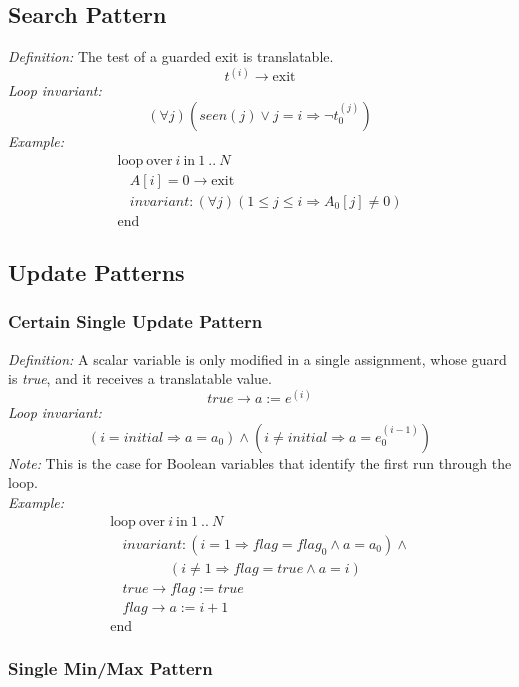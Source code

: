 \documentclass[a4paper,10pt]{article}
\newcommand{\idx}{\ensuremath{i}\xspace}
\newcommand{\idxinitial}{\ensuremath{\mathit{initial}}\xspace}
\newcommand{\at}[1]{{(#1)}}
\newcommand{\KWloop}{\ensuremath{\mathrm{loop}~}}
\newcommand{\KWend}{\ensuremath{\mathrm{end}~}}
\newcommand{\KWover}{\ensuremath{\mathrm{over}~}}
\newcommand{\KWin}{\ensuremath{~\mathrm{in}~}}
\newcommand{\KWexit}{\ensuremath{\mathrm{exit}}}
\newcommand{\impl}{\ensuremath{\Longrightarrow}}
\newcommand{\seen}[1]{\ensuremath{\mathit{seen}(#1)}\xspace}
\newcommand{\loopinvariant}{\noindent\textit{Loop invariant:}\xspace}
\newcommand{\patterndef}{\noindent\textit{Definition:}\xspace}
\newcommand{\patternexample}{\noindent\textit{Example:}\xspace}
\newcommand{\patternnote}{\noindent\textit{Note:}\xspace}
\newcommand{\translatable}{translatable}
\begin{document}
\subsection{Search Pattern}

\patterndef The test of a guarded exit is \translatable.
%
$$t^\at{\idx} \rightarrow \KWexit$$
%
\loopinvariant
%
$$(\forall j)(\seen{j} \lor j = i \impl \neg t_{0}^\at{j})$$
%
\patternexample
$$\begin{array}{l}
  \KWloop \KWover i \KWin 1~..~N \\
  ~~~~ A[i]=0 \rightarrow \KWexit \\
  ~~~~ \textit{invariant}:(\forall j)(1\leq j\leq i \impl A_{0}[j] \neq 0)\\
  \KWend
\end{array}$$

\subsection{Update Patterns}

\subsubsection*{Certain Single Update Pattern}

\patterndef A scalar variable is only modified in a single assignment, whose
guard is \textit{true}, and it receives a translatable value.
%
$$\mathit{true} \rightarrow a := e^\at{\idx}$$
%
\loopinvariant
%
$$(\idx = \idxinitial \impl a = a_0) \land (\idx \neq \idxinitial \impl a = e_0^\at{\idx - 1})$$
%
\patternnote This is the case for Boolean variables that identify the first run
through the loop.\\
%
\patternexample
$$\begin{array}{l}
  \KWloop \KWover i \KWin 1~..~N \\
  ~~~~ \textit{invariant}: (\idx = 1 \impl flag = flag_0 \land a = a_0) \land \\
  ~~~~~~~~~~~~~~~~~~~ (\idx \neq 1 \impl flag = true \land a = i)\\
  ~~~~ true \rightarrow flag := true\\
  ~~~~ flag \rightarrow a := i+1\\
  \KWend
\end{array}$$

\subsubsection*{Single Min/Max Pattern}
\end{document}
